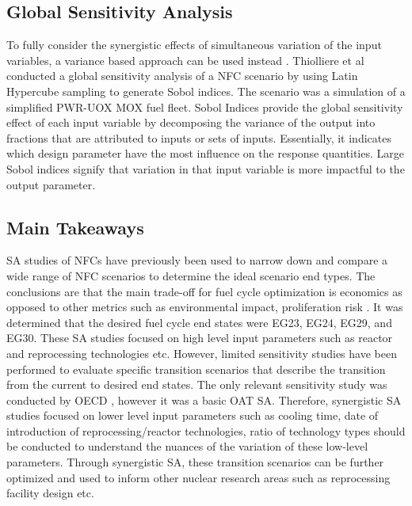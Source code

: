 \subsection{Global Sensitivity Analysis}
To fully consider the synergistic effects of
simultaneous variation of the input variables, a variance 
based approach can be used instead \cite{thiolliere_methodology_2018}.
Thiolliere et al conducted a global sensitivity analysis of a 
\gls{NFC} scenario by using Latin Hypercube sampling 
to generate Sobol indices. 
The scenario was a simulation of a simplified PWR-UOX MOX fuel 
fleet. 
Sobol Indices provide the global sensitivity effect of each input 
variable by decomposing the variance of the output into fractions 
that are attributed to inputs or sets of inputs. 
Essentially, it indicates which design parameter have the most 
influence on the response quantities. 
Large Sobol indices signify that variation in that 
input variable is more impactful to the output parameter. 

\subsection{Main Takeaways}
\gls{SA} studies of \glspl{NFC} have previously been used to narrow 
down and compare a wide range of \gls{NFC} scenarios to determine 
the ideal scenario end types. 
The conclusions are that the main trade-off for fuel cycle 
optimization is economics as opposed to
other metrics such as environmental impact, proliferation 
risk \cite{passerini_systematic_2014}.
It was determined that the desired fuel cycle end states 
were EG23, EG24, EG29, and EG30.
These \gls{SA} studies focused on high level input 
parameters such as reactor and reprocessing technologies etc.
However, limited sensitivity studies have been performed to 
evaluate specific transition scenarios that describe the transition 
from the current to desired end states.
The only relevant sensitivity study was conducted by OECD 
\cite{noauthor_effects_2017}, however it was a basic OAT 
\gls{SA}.   
Therefore, synergistic \gls{SA} studies focused on
lower level input parameters such as cooling time, 
date of introduction of reprocessing/reactor 
technologies, ratio of technology types should be conducted to 
understand the nuances of the variation of these low-level parameters. 
Through synergistic \gls{SA}, these transition scenarios can be 
further optimized and used to inform other nuclear research areas 
such as reprocessing facility design etc. 